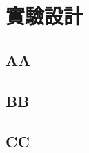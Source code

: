 \renewcommand\thetable{\arabic{chapter}-\arabic{table}}
\chapter{實驗設計}
\label{cha:experimentdesign}



\section{AA}
\label{sec:experimentdesign-xxx}



\section{BB}
\label{sec:experimentdesign-yyy}



\section{CC}
\label{sec:experimentdesign-zzz}



